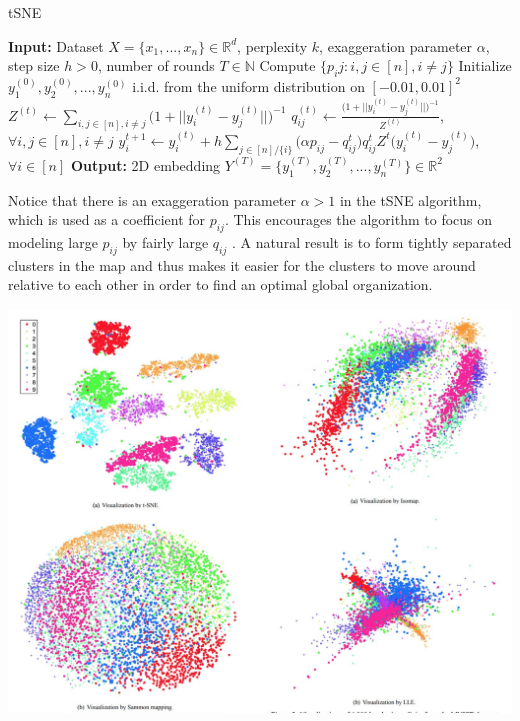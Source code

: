 \begin{algorithm}
\caption{tSNE}
\begin{algorithmic} 
\STATE \textbf{Input:} Dataset $X=\{x_1,...,x_n\} \in \mathbb{R}^d$,
perplexity $k$, exaggeration parameter $\alpha$, step size $h>0$,
number of rounds $T \in \mathbb{N}$\; 
\STATE Compute $\{p_ij:i,j\in [n],i\neq j\}$
\STATE Initialize $y_1^{(0)}, y_2^{(0)},...,y_n^{(0)}$ i.i.d. from the
uniform distribution on $[-0.01,0.01]^2$ 
    \STATE $Z^{(t)} \leftarrow \sum_{i,j\in [n],i\neq j}\Big ( 1+ ||y_i^{(t)}-y_j^{(t)}|| \Big )^{-1}$
    \STATE $q_{ij}^{(t)} \leftarrow \frac{\Big ( 1+ ||y_i^{(t)}-y_j^{(t)}|| \Big )^{-1}}{Z^{(t)}}$, $\forall i,j\in [n],i\neq j$
    \STATE $y_i^{t+1}\leftarrow y_i^{(t)}+h\sum_{j\in [n] / \{i\}} \Big (\alpha p_{ij}-q_{ij}^t \Big )q_{ij}^t Z^t\Big (y_i^{(t)}-y_j^{(t)} \Big )$, $\forall i \in [n]$
\ENDFOR
\STATE \textbf{Output:} 2D embedding $Y^{(T)}=\Big\{y_1^{(T)},y_2^{(T)},...,y_n^{(T)} \Big\} \in \mathbb{R}^2$
\end{algorithmic}
\end{algorithm}

Notice that there is an exaggeration parameter $\alpha > 1$ in the
tSNE algorithm, which is used as a coefficient for $p_{ij}$. This
encourages the algorithm to focus on modeling large $p_{ij}$ by fairly
large $q_{ij}$ . A natural result is to form tightly separated
clusters in the map and thus makes it easier for the clusters to move
around relative to each other in order to find an optimal global
organization. 

\begin{center}
    \includegraphics[scale=0.28]{chapter_7/files/fig3.png}
\end{center}

